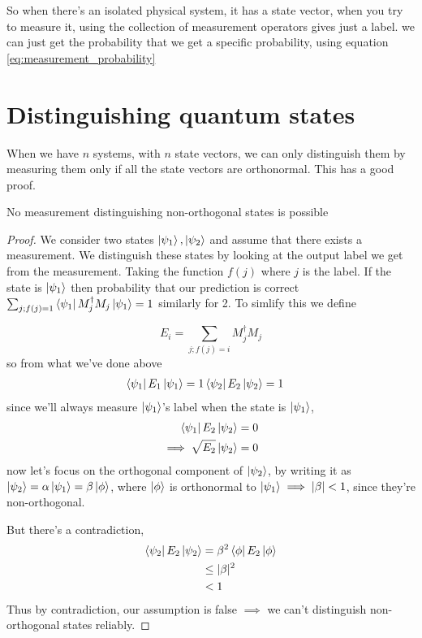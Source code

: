 So when there's an isolated physical system, it has a state vector, when you try to measure it, using the collection of measurement operators gives just a label. we can just get the probability that we get a specific probability, using equation \ref{eq:measurement_probability}

\section{Distinguishing quantum states}
When we have $n$ systems, with $n$ state vectors, we can only distinguish them by measuring them only if all the state vectors are orthonormal. This has a good proof.

\begin{theorem}
    No measurement distinguishing non-orthogonal states is possible
\end{theorem}

\begin{proof}
    We consider two states $\ket{\psi_1}, \ket{\psi_2}$ and assume that there exists a measurement. We distinguish these states by looking at the output label we get from the measurement. Taking the function $f(j)$ where $j$ is the label. If the state is $\ket{\psi_1}$ then probability that our prediction is correct $\sum_{j; f(j)=1} \bra{\psi_1}M_j^\dag M_j \ket{\psi_1} = 1$ similarly for 2. To simlify this we define

    \begin{equation}
        E_i = \sum_{j; f(j) = i} M_j^\dag M_j
    \end{equation}
    so from what we've done above
    \begin{align}
        \bra{\psi_1}E_1\ket{\psi_1} = 1 &
        \bra{\psi_2}E_2\ket{\psi_2} = 1
    \end{align}
    since we'll always measure $\ket{\psi_1}$'s label when the state is $\ket{\psi_1}$,
    \begin{align}
        \bra{\psi_1}E_2\ket{\psi_2} &= 0 \\
        \implies \sqrt{E_2}\ket{\psi_2} &= 0
    \end{align}
    now let's focus on the orthogonal component of $\ket{\psi_2}$, by writing it as $\ket{\psi_2} = \alpha \ket{\psi_1} = \beta \ket{\phi}$, where $\ket{\phi}$ is orthonormal to $\ket{\psi_1} \implies 
    |\beta| < 1$, since they're non-orthogonal.

    But there's a contradiction,
    \begin{align}
        \bra{\psi_2}E_2\ket{\psi_2} &=
        \beta^2 \bra{\phi}E_2\ket{\phi} \\
        &\leq |\beta|^2 \\
        &< 1 
    \end{align}
    Thus by contradiction, our assumption is false $\implies$ we can't distinguish non-orthogonal states reliably.
\end{proof}

